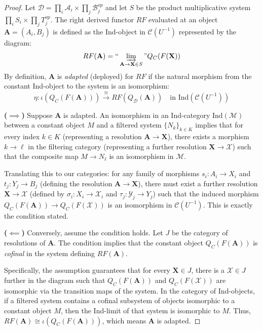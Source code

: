 \begin{proof}
    Let $\mathscr{D} = \prod_i \mathscr{A}_i \times \prod_j \mathscr{B}_j^{op}$ and let $S$ be the product multiplicative system $\prod_i S_i \times \prod_j T_j^{op}$. The right derived functor $RF$ evaluated at an object $\mathbf{A} = (A_i, B_j)$ is defined as the Ind-object in $\mathscr{C}(U^{-1})$ represented by the diagram:
    \[ RF(\mathbf{A}) = \text{``}\varinjlim_{\mathbf{A} \to \mathbf{X} \in S}\text{''} Q_C(F(\mathbf{X})) \]
    By definition, $\mathbf{A}$ is \textit{adapted} (deployed) for $RF$ if the natural morphism from the constant Ind-object to the system is an isomorphism:
    \[ \eta: \iota(Q_C(F(\mathbf{A}))) \xrightarrow{\cong} RF(Q_{\mathscr{D}}(\mathbf{A})) \quad \text{in } \text{Ind}(\mathscr{C}(U^{-1})) \]

    \noindent \textbf{($\implies$)} Suppose $\mathbf{A}$ is adapted. An isomorphism in an Ind-category $\text{Ind}(\mathcal{M})$ between a constant object $M$ and a filtered system $\{N_k\}_{k \in K}$ implies that for every index $k \in K$ (representing a resolution $\mathbf{A} \to \mathbf{X}$), there exists a morphism $k \to \ell$ in the filtering category (representing a further resolution $\mathbf{X} \to \boldsymbol{\mathcal{X}}$) such that the composite map $M \to N_\ell$ is an isomorphism in $\mathcal{M}$. 
    
    Translating this to our categories: for any family of morphisms $s_i: A_i \to X_i$ and $t_j: Y_j \to B_j$ (defining the resolution $\mathbf{A} \to \mathbf{X}$), there must exist a further resolution $\mathbf{X} \to \boldsymbol{\mathcal{X}}$ (defined by $\sigma_i: X_i \to \mathcal{X}_i$ and $\tau_j: \mathcal{Y}_j \to Y_j$) such that the induced morphism $Q_C(F(\mathbf{A})) \to Q_C(F(\boldsymbol{\mathcal{X}}))$ is an isomorphism in $\mathscr{C}(U^{-1})$. This is exactly the condition stated.

    \vspace{1em}
    \noindent \textbf{($\impliedby$)} Conversely, assume the condition holds. Let $J$ be the category of resolutions of $\mathbf{A}$. The condition implies that the constant object $Q_C(F(\mathbf{A}))$ is \textit{cofinal} in the system defining $RF(\mathbf{A})$. 
    
    Specifically, the assumption guarantees that for every $\mathbf{X} \in J$, there is a $\boldsymbol{\mathcal{X}} \in J$ further in the diagram such that $Q_C(F(\mathbf{A}))$ and $Q_C(F(\boldsymbol{\mathcal{X}}))$ are isomorphic via the transition maps of the system. In the category of Ind-objects, if a filtered system contains a cofinal subsystem of objects isomorphic to a constant object $M$, then the Ind-limit of that system is isomorphic to $M$. Thus, $RF(\mathbf{A}) \cong \iota(Q_C(F(\mathbf{A})))$, which means $\mathbf{A}$ is adapted.
\end{proof}

